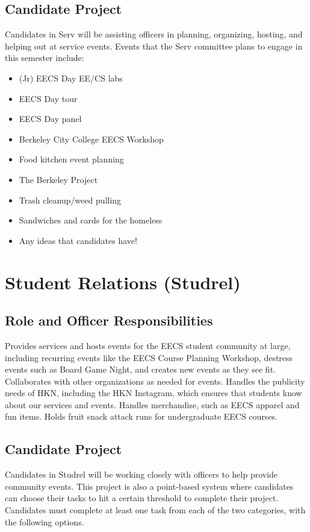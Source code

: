 \documentclass[11pt, article, oneside]{memoir}
\begin{document}
    \subsection{Candidate Project}
        Candidates in Serv will be assisting officers in planning, organizing, hosting, and helping out at service events. Events that the Serv committee plans to engage in this semester include:
        \begin{itemize}
            \item (Jr) EECS Day EE/CS labs
            \item EECS Day tour
            \item EECS Day panel 
            \item Berkeley City College EECS Workshop 
            \item Food kitchen event planning 
            \item The Berkeley Project 
            \item Trash cleanup/weed pulling
            \item Sandwiches and cards for the homeless
            \item Any ideas that candidates have!
        \end{itemize}

    \bigbreak

    \section{Student Relations (Studrel)}
    \subsection{Role and Officer Responsibilities}
        Provides services and hosts events for the EECS student community at large, including recurring events like the EECS Course Planning Workshop, destress events such as Board Game Night, and creates new events as they see fit. Collaborates with other organizations as needed for events. Handles the publicity needs of HKN, including the HKN Instagram, which ensures that students know about our services and events. Handles merchandise, such as EECS apparel and fun items. Holds fruit snack attack runs for undergraduate EECS courses.

    \subsection{Candidate Project}
        Candidates in Studrel will be working closely with officers to help provide community events. This project is also a point-based system where candidates can choose their tasks to hit a certain threshold to complete their project. Candidates must complete at least one task from each of the two categories, with the following options.
\end{document}
